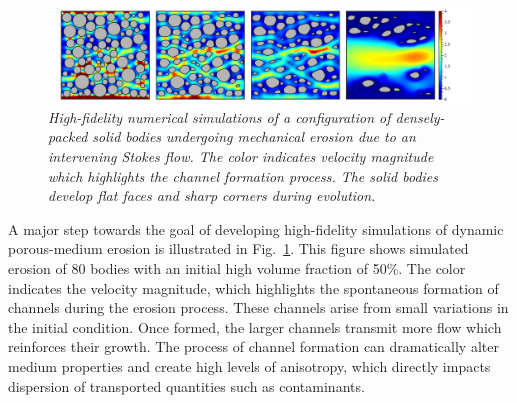 \documentclass[11pt]{article}
\begin{document}
\begin{figure}%
\begin{center}
\includegraphics[width = 0.99 \textwidth]{./figs/80circ8vel.pdf}
\caption{\label{80circ8vel} \em High-fidelity numerical simulations of a configuration of densely-packed solid bodies undergoing mechanical erosion due to an intervening Stokes flow. The color indicates velocity magnitude which highlights the channel formation process. The solid bodies develop flat faces and sharp corners during evolution. }
\end{center}
\end{figure}

A major step towards the goal of developing high-fidelity simulations of
dynamic porous-medium erosion is illustrated in Fig.~\ref{80circ8vel}.
This figure shows simulated erosion of 80 bodies with an initial high
volume fraction of 50\%. The color indicates the velocity magnitude, which highlights the spontaneous formation of channels during the erosion process. These channels arise from small variations in the initial condition. Once formed, the larger channels transmit more flow which reinforces their growth. The process of channel formation can dramatically alter medium properties and create high levels of anisotropy, which directly impacts dispersion of transported quantities such as contaminants.
\end{document}
